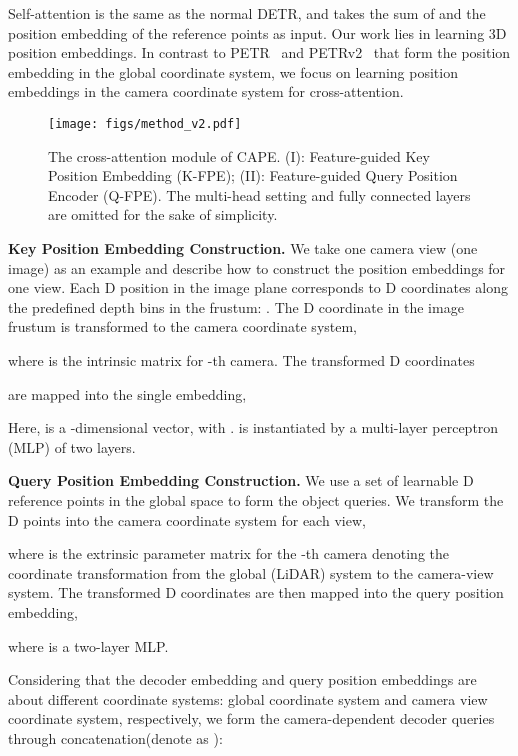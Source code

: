 \documentclass[10pt,twocolumn,letterpaper]{article}
\newcommand{\ourMethod}{CAPE}
\begin{document}
Self-attention is the same as the normal DETR,
and 
takes the sum of 
and the position embedding of the reference points  as input.
Our work lies in learning 3D position embeddings.
In contrast to PETR~\cite{liu2022petr} and PETRv2~\cite{liu2022petrv2}
that form the position embedding
in the global coordinate system,
we focus on learning
position embeddings
in the camera coordinate system
for cross-attention.




\begin{figure}[t]
\centering
\texttt{[image: figs/method\_v2.pdf]}
\caption{The cross-attention module of \ourMethod{}. (I): Feature-guided Key Position Embedding (K-FPE); (II): Feature-guided Query Position Encoder (Q-FPE). The multi-head setting and fully connected layers are omitted for the sake of simplicity.}
\centering
\label{fig:transformer}
\vspace{-15pt}
\end{figure}


\vspace{2mm}
\noindent\textbf{Key Position Embedding Construction.}
We take one camera view (one image)
as an example
and describe how to construct the position embeddings
for one view.
Each D position in the image plane
corresponds to  D coordinates along the predefined depth bins in the frustum:
.
The D coordinate in the image frustum is transformed 
to the camera coordinate system,

where  is the intrinsic matrix for -th camera.
The  transformed D coordinates 

are mapped into the single embedding,

Here,  is a -dimensional vector, with 
.
 is instantiated by a multi-layer perceptron (MLP) of two layers.


\vspace{2mm}
\noindent\textbf{Query Position Embedding Construction.}
We use a set of learnable D reference points 
 in the global space 
to form the object queries. We transform the  D points
into the camera coordinate system for each view,

where  is the extrinsic parameter matrix
for the -th camera denoting the coordinate transformation from the global (LiDAR) system to the camera-view system.
The transformed D coordinates
are then mapped into 
the query position embedding,

where  is a two-layer MLP.

Considering that
the decoder embedding 
and query position embeddings
are about different coordinate systems:
global coordinate system
and camera view coordinate system,
respectively,
we form the camera-dependent decoder queries
through concatenation(denote as ):
\end{document}
